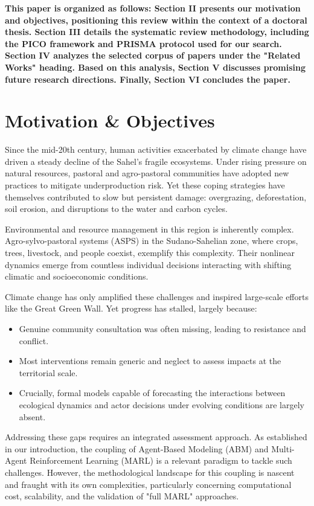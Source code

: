 \documentclass[conference]{IEEEtran}
\begin{document}
\textbf{This paper is organized as follows: Section II presents our motivation and objectives, positioning this review within the context of a doctoral thesis. Section III details the systematic review methodology, including the PICO framework and PRISMA protocol used for our search. Section IV analyzes the selected corpus of papers under the "Related Works" heading. Based on this analysis, Section V discusses promising future research directions. Finally, Section VI concludes the paper.}

\section{Motivation \& Objectives}

Since the mid-20th century, human activities exacerbated by climate change have driven a steady decline of the Sahel’s fragile ecosystems. Under rising pressure on natural resources, pastoral and agro-pastoral communities have adopted new practices to mitigate underproduction risk. Yet these coping strategies have themselves contributed to slow but persistent damage: overgrazing, deforestation, soil erosion, and disruptions to the water and carbon cycles.

Environmental and resource management in this region is inherently complex. Agro-sylvo-pastoral systems (ASPS) in the Sudano-Sahelian zone, where crops, trees, livestock, and people coexist, exemplify this complexity. Their nonlinear dynamics emerge from countless individual decisions interacting with shifting climatic and socioeconomic conditions.

Climate change has only amplified these challenges and inspired large-scale efforts like the Great Green Wall. Yet progress has stalled, largely because:
\begin{itemize}
    \item Genuine community consultation was often missing, leading to resistance and conflict.
    \item Most interventions remain generic and neglect to assess impacts at the territorial scale.
    \item Crucially, formal models capable of forecasting the interactions between ecological dynamics and actor decisions under evolving conditions are largely absent.
\end{itemize}

Addressing these gaps requires an integrated assessment approach. As established in our introduction, the coupling of Agent-Based Modeling (ABM) and Multi-Agent Reinforcement Learning (MARL) is a relevant paradigm to tackle such challenges. However, the methodological landscape for this coupling is nascent and fraught with its own complexities, particularly concerning computational cost, scalability, and the validation of "full MARL" approaches.
\end{document}
